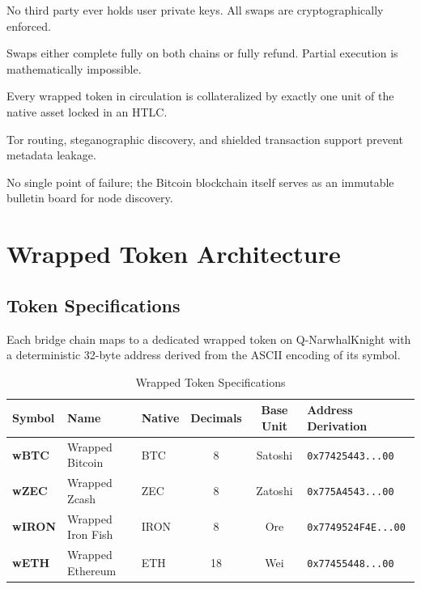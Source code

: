 \documentclass[11pt,a4paper]{article}
\begin{document}
\begin{description}[leftmargin=2em, style=nextline]
    \item[\textcolor{qnkblue}{Non-Custodial}] No third party ever holds user private keys. All swaps are cryptographically enforced.
    \item[\textcolor{qnkblue}{Atomic}] Swaps either complete fully on both chains or fully refund. Partial execution is mathematically impossible.
    \item[\textcolor{qnkblue}{1:1 Backed}] Every wrapped token in circulation is collateralized by exactly one unit of the native asset locked in an HTLC.
    \item[\textcolor{qnkblue}{Privacy-First}] Tor routing, steganographic discovery, and shielded transaction support prevent metadata leakage.
    \item[\textcolor{qnkblue}{Censorship-Resistant}] No single point of failure; the Bitcoin blockchain itself serves as an immutable bulletin board for node discovery.
\end{description}

\section{Wrapped Token Architecture}

\subsection{Token Specifications}

Each bridge chain maps to a dedicated wrapped token on Q-NarwhalKnight with a deterministic 32-byte address derived from the ASCII encoding of its symbol.

\begin{table}[H]
\centering
\caption{Wrapped Token Specifications}
\label{tab:token-specs}
\begin{tabularx}{\textwidth}{l l l c c X}
\toprule
\textbf{Symbol} & \textbf{Name} & \textbf{Native} & \textbf{Decimals} & \textbf{Base Unit} & \textbf{Address Derivation} \\
\midrule
\textcolor{btcorange}{\textbf{wBTC}} & Wrapped Bitcoin & BTC & 8 & Satoshi & \texttt{0x77425443...00} \\
\textcolor{zecyellow!80!black}{\textbf{wZEC}} & Wrapped Zcash & ZEC & 8 & Zatoshi & \texttt{0x775A4543...00} \\
\textcolor{ironpurple}{\textbf{wIRON}} & Wrapped Iron Fish & IRON & 8 & Ore & \texttt{0x7749524F4E...00} \\
\textcolor{blue!70}{\textbf{wETH}} & Wrapped Ethereum & ETH & 18 & Wei & \texttt{0x77455448...00} \\
\bottomrule
\end{tabularx}
\end{table}
\end{document}

